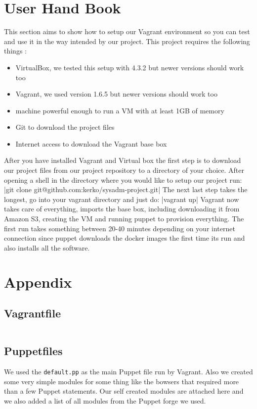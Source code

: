 \section{User Hand Book}

This section aims to show how to setup our Vagrant environment so you can test and use it in the way intended by our project.
This project requires the following things :
\begin{itemize}
\item VirtualBox, we tested this setup with 4.3.2 but newer versions should work too
\item Vagrant, we used version 1.6.5 but newer versions should work too
\item machine powerful enough to run a \gls{VM} with at least 1GB of memory
\item Git to download the project files
\item Internet access to download the Vagrant base \gls{box}
\end{itemize}


After you have installed Vagrant and Virtual box the first step is to download our project files from our project repository to a directory of your choice. After opening a shell in the directory where you would like to setup our project run: |git clone git@github.com:kerko/sysadm-project.git|
The next last step takes the longest, go into your vagrant directory and just do: |vagrant up| Vagrant now takes care of everything, imports the base box, including downloading it from Amazon S3, creating the \gls{VM} and running puppet to provision everything. The first run takes something between 20-40 minutes depending on your internet connection since puppet downloads the docker images the first time its run and also installs all the software.




\cleardoublepage{}
\section{Appendix}
\subsection{Vagrantfile}
\inputminted[linenos=true]{ruby}{../../Vagrant/Vagrantfile}
\subsection{Puppetfiles}
We used the \verb|default.pp| as the main Puppet file run by Vagrant. Also we created some very simple modules for some thing like the bowsers that required more than a few Puppet statements. Our self created modules are attached here and we also added a list of all modules from the Puppet forge we used.
